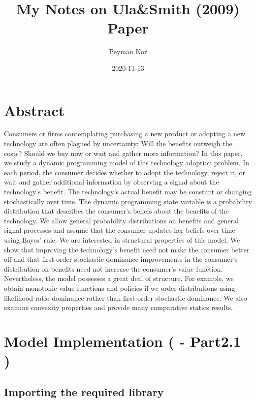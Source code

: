 \documentclass[
]{book}
\title{My Notes on Ula\&Smith (2009) Paper}
\author{Peyman Kor}
\date{2020-11-13}
\begin{document}
\maketitle

{
\setcounter{tocdepth}{1}
\tableofcontents
}
\hypertarget{abstract}{%
\chapter{Abstract}\label{abstract}}

Consumers or firms contemplating purchasing a new product or adopting a new technology are often plagued by uncertainty: Will the benefits outweigh the costs? Should we buy now or wait and gather more information? In this paper, we study a dynamic programming model of this technology adoption problem. In each period, the consumer decides whether to adopt the technology, reject it, or wait and gather additional information by observing a signal about the technology's benefit. The technology's actual benefit may be constant or changing stochastically over time. The dynamic programming state variable is a probability distribution that describes the consumer's beliefs about the benefits of the technology. We allow general probability distributions on benefits and general signal processes and assume that the consumer updates her beliefs over time using Bayes' rule. We are interested in structural properties of this model. We show that improving the technology's benefit need not make the consumer better off and that first-order stochastic dominance improvements in the consumer's distribution on benefits need not increase the consumer's value function. Nevertheless, the model possesses a great deal of structure. For example, we obtain monotonic value functions and policies if we order distributions using
likelihood-ratio dominance rather than first-order stochastic dominance. We also examine convexity properties and provide many comparative statics results.

\hypertarget{model-implementation---part2.1}{%
\chapter{Model Implementation ( - Part2.1 )}\label{model-implementation---part2.1}}

\hypertarget{importing-the-required-library}{%
\section{Importing the required library}\label{importing-the-required-library}}
\end{document}
